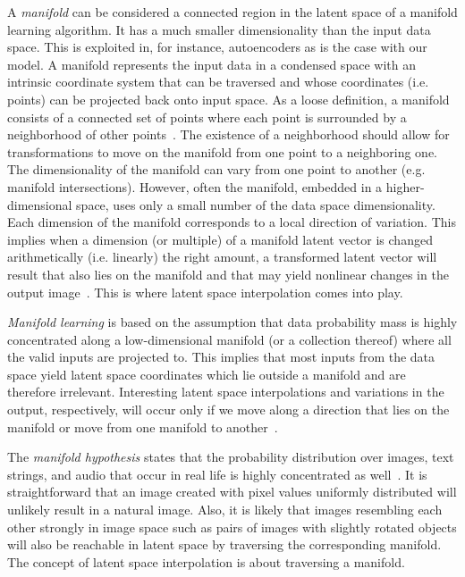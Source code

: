 \documentclass[a4paper,12pt]{report}
\begin{document}
A \textit{manifold} can be considered a connected region in the latent space of a manifold learning algorithm. It has a much smaller dimensionality than the input data space. This is exploited in, for instance, autoencoders as is the case with our model. A manifold represents the input data in a condensed space with an intrinsic coordinate system that can be traversed and whose coordinates (i.e. points) can be projected back onto input space. As a loose definition, a manifold consists of a connected set of points where each point is surrounded by a neighborhood of other points~\cite{DeepLearningBook}. The existence of a neighborhood should allow for transformations to move on the manifold from one point to a neighboring one. The dimensionality of the manifold can vary from one point to another (e.g. manifold intersections). However, often the manifold, embedded in a higher-dimensional space, uses only a small number of the data space dimensionality. Each dimension of the manifold corresponds to a local direction of variation. This implies when a dimension (or multiple) of a manifold latent vector is changed arithmetically (i.e. linearly) the right amount, a transformed latent vector will result that also lies on the manifold and that may yield nonlinear changes in the output image~\cite{StyleGAN}. This is where latent space interpolation comes into play. 

\textit{Manifold learning} is based on the assumption that data probability mass is highly concentrated along a low-dimensional manifold (or a collection thereof) where all the valid inputs are projected to. This implies that most inputs from the data space yield latent space coordinates which lie outside a manifold and are therefore irrelevant. Interesting latent space interpolations and variations in the output, respectively, will occur only if we move along a direction that lies on the manifold or move from one manifold to another~\cite{DeepLearningBook}.

The \textit{manifold hypothesis} states that the probability distribution over images, text strings, and audio that occur in real life is highly concentrated as well~\cite{ReprLearning}. It is straightforward that an image created with pixel values uniformly distributed will unlikely result in a natural image. Also, it is likely that images resembling each other strongly in image space such as pairs of images with slightly rotated objects will also be reachable in latent space by traversing the corresponding manifold. The concept of latent space interpolation is about traversing a manifold.
\end{document}
